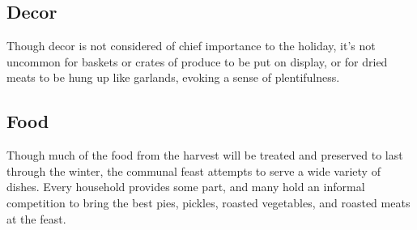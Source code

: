 \documentclass[10pt,a4paper,twoside,twocolumn,openany,bg=print,nodeprecatedcode]{dndbook}
\begin{document}
\subsection{Decor}
Though decor is not considered of chief importance to the holiday, it's not uncommon for baskets or crates of produce to be put on display, or for dried meats to be hung up like garlands, evoking a sense of plentifulness.
\subsection{Food}
Though much of the food from the harvest will be treated and preserved to last through the winter, the communal feast attempts to serve a wide variety of dishes. Every household provides some part, and many hold an informal competition to bring the best pies, pickles, roasted vegetables, and roasted meats at the feast.
\end{document}
